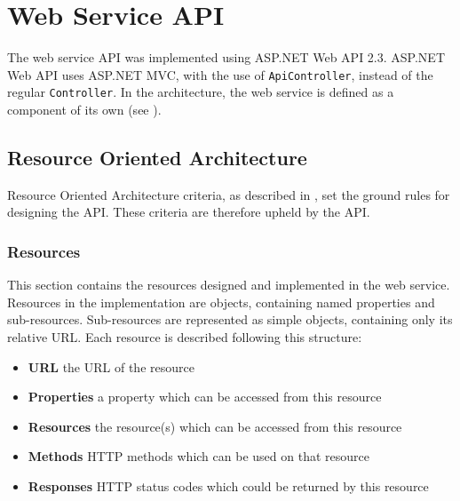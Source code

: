 \section{Web Service API}\label{design:web_service}
The web service API was implemented using ASP.NET Web API 2.3\cite{aspnet_webapi}.
ASP.NET Web API uses ASP.NET MVC\cite{aspnet_mvc}, with the use of \texttt{ApiController}, instead of the regular \texttt{Controller}.
In the architecture, the web service is defined as a component of its own (see ).

\subsection{Resource Oriented Architecture}
Resource Oriented Architecture criteria, as described in , set the ground rules for designing the API.
These criteria are therefore upheld by the API.

\subsubsection{Resources}\label{webservice:resources}
This section contains the resources designed and implemented in the web service.
Resources in the implementation are objects, containing named properties and sub-resources.
Sub-resources are represented as simple objects, containing only its relative URL.
Each resource is described following this structure:
\begin{itemize}
\item \textbf{URL} the URL of the resource
\item \textbf{Properties} a property which can be accessed from this resource
\item \textbf{Resources} the resource(s) which can be accessed from this resource
\item \textbf{Methods} HTTP methods which can be used on that resource
\item \textbf{Responses} HTTP status codes which could be returned by this resource
\end{itemize}

